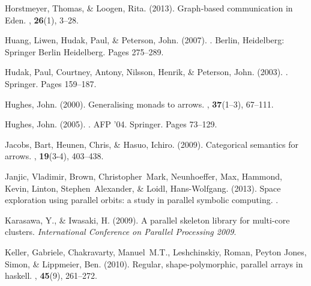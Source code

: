 \documentclass{jfp1}
\begin{document}
\begin{thebibliography}{}
Horstmeyer, Thomas, \& Loogen, Rita. (2013).
\newblock Graph-based communication in {Eden}.
, {\bf 26}(1), 3--28.

Huang, Liwen, Hudak, Paul, \& Peterson, John. (2007).
.
\newblock Berlin, Heidelberg: Springer Berlin Heidelberg.
\newblock Pages  275--289.

Hudak, Paul, Courtney, Antony, Nilsson, Henrik, \& Peterson, John. (2003).
.
\newblock Springer.
\newblock Pages  159--187.

Hughes, John. (2000).
\newblock Generalising monads to arrows.
, {\bf 37}(1–3), 67--111.

Hughes, John. (2005).
.
\newblock AFP '04.
\newblock Springer.
\newblock Pages  73--129.

Jacobs, Bart, Heunen, Chris, \& Hasuo, Ichiro. (2009).
\newblock Categorical semantics for arrows.
, {\bf 19}(3-4), 403--438.

Janjic, Vladimir, Brown, Christopher~Mark, Neunhoeffer, Max, Hammond, Kevin,
  Linton, Stephen~Alexander, \& Loidl, Hans-Wolfgang. (2013).
\newblock Space exploration using parallel orbits: a study in parallel symbolic
  computing.
.

Karasawa, Y., \& Iwasaki, H. (2009).
\newblock A parallel skeleton library for multi-core clusters.
 {\em International Conference on Parallel
  Processing 2009}.

Keller, Gabriele, Chakravarty, Manuel~M.T., Leshchinskiy, Roman, {Peyton
  Jones}, Simon, \& Lippmeier, Ben. (2010).
\newblock Regular, shape-polymorphic, parallel arrays in haskell.
, {\bf 45}(9), 261--272.


\end{thebibliography}
\end{document}
